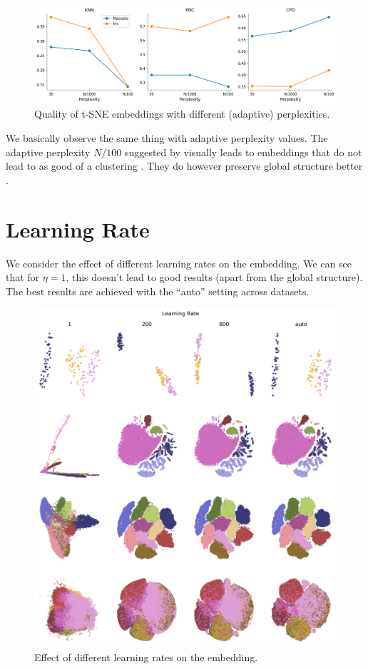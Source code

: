 \begin{figure}[h]
    \centering 
        \includegraphics[width=\linewidth]{../code/figures/perp_adapt_3_quality_measures.png}
        \caption{Quality of t-SNE embeddings with different (adaptive) perplexities.}
    \label{fig:perp_adapt_quality}
\end{figure}

We basically observe the same thing with adaptive perplexity values. 
The adaptive perplexity $N/100$ suggested by \cite{KoBe19SingleCell} visually leads to embeddings that do not lead to as good of a clustering . 
They do however preserve global structure better . 
\newpage 
\section{Learning Rate}
We consider the effect of different learning rates on the embedding. We can see that for $\eta=1$, this doesn't lead to good results (apart from the global structure). The best results are achieved with the \enquote{auto} setting across datasets. 
\begin{figure}[h]
    \centering 
        \includegraphics[width=\linewidth]{../code/figures/eta_embedding_grid_tab20b.png}
        \caption{Effect of different learning rates on the embedding.}
    \label{fig:eta_grid}
\end{figure} 

